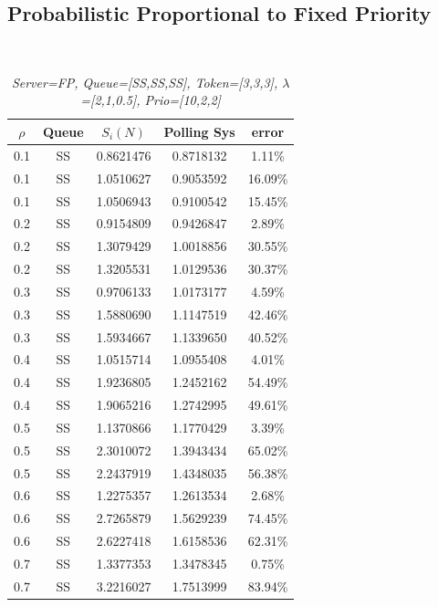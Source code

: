 \documentclass[12pt,a4paper,italian]{article}
\begin{document}
\subsection{Probabilistic Proportional to Fixed Priority}
\ \ \
\begin{table}[ht!]
	\begin{minipage}[b]{0.48\linewidth}\centering
		\centering
		\caption{\scriptsize \emph{Server=FP, Queue=[SS,SS,SS], Token=[3,3,3], $\lambda$=[2,1,0.5], Prio=[10,2,2] }}
		\label{tab13}
		\tiny
		\begin{tabular}{c c c c c}
			\hline
			$\rho$ & Queue & $S_i(N)$ & Polling Sys & error \\ \hline
			0.1 & SS & 0.8621476 &   0.8718132    &  1.11\%  \\
			0.1 & SS & 1.0510627 &   0.9053592    & 16.09\%  \\
			0.1 & SS & 1.0506943 &   0.9100542    & 15.45\%  \\ \hline \hline
			0.2 & SS & 0.9154809 &   0.9426847    &  2.89\%  \\
			0.2 & SS & 1.3079429 &   1.0018856    & 30.55\%  \\
			0.2 & SS & 1.3205531 &   1.0129536    & 30.37\%  \\ \hline \hline
			0.3 & SS & 0.9706133 &   1.0173177    &  4.59\%  \\
			0.3 & SS & 1.5880690 &   1.1147519    & 42.46\%  \\
			0.3 & SS & 1.5934667 &   1.1339650    & 40.52\%  \\ \hline \hline
			0.4 & SS & 1.0515714 &   1.0955408    &  4.01\%  \\
			0.4 & SS & 1.9236805 &   1.2452162    & 54.49\%  \\
			0.4 & SS & 1.9065216 &   1.2742995    & 49.61\%  \\ \hline \hline
			0.5 & SS & 1.1370866 &   1.1770429    &  3.39\%  \\
			0.5 & SS & 2.3010072 &   1.3943434    & 65.02\%  \\
			0.5 & SS & 2.2437919 &   1.4348035    & 56.38\%  \\ \hline \hline
			0.6 & SS & 1.2275357 &   1.2613534    &  2.68\%  \\
			0.6 & SS & 2.7265879 &   1.5629239    & 74.45\%  \\
			0.6 & SS & 2.6227418 &   1.6158536    & 62.31\%  \\ \hline \hline
			0.7 & SS & 1.3377353 &   1.3478345    &  0.75\%  \\
			0.7 & SS & 3.2216027 &   1.7513999    & 83.94\%  \\

\end{tabular}
\end{minipage}
\end{table}
\end{document}
